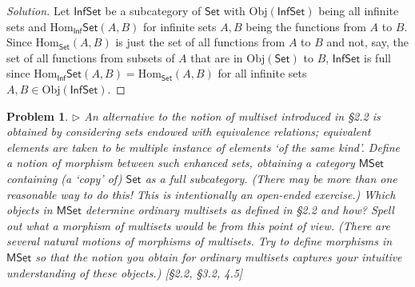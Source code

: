 \documentclass[fontsize=14pt]{scrartcl}
\newtheorem{problem-internal}{Problem}[subsection]
\newenvironment{problem}{
  \medskip
  \begin{problem-internal}
}{
  \end{problem-internal}
}
\newenvironment{solution}{
  \begin{proof}[Solution]
  \vspace{-8px}
  \setlength{\parskip}{4px}
  \setlength{\parindent}{0px}
}{
  \end{proof}
}
\newcommand{\Obj}{\mathrm{Obj}}
\newcommand{\Hom}{\mathrm{Hom}}
\begin{document}
\begin{solution}
\def \C {\mathsf{C}}
\def \Cp {\C'}
\def \Set {\mathsf{Set}}
\def \ISet {\mathsf{Inf}\mathsf{Set}}

Let $\ISet$ be a subcategory of $\Set$ with $\Obj(\ISet)$ being all infinite
sets and $\Hom_\ISet(A,B)$ for infinite sets $A,B$ being the functions from $A$
to $B$. Since $\Hom_\Set(A,B)$ is just the set of all functions from $A$ to $B$
and not, say, the set of all functions from subsets of $A$ that are in
$\Obj(\Set)$ to $B$, $\ISet$ is full since $\Hom_\ISet(A,B)=\Hom_\Set(A,B)$ for
all infinite sets $A,B\in\Obj(\ISet)$.
\end{solution}


\begin{problem}
\def \Set {\mathsf{Set}}
\def \MSet {\mathsf{MSet}}

$\rhd$ An alternative to the notion of \textit{multiset} introduced in
\S2.2 is obtained by considering sets endowed with equivalence relations;
equivalent elements are taken to be multiple instance of elements `of the same
kind'. Define a notion of morphism between such enhanced sets, obtaining a
category $\MSet$ containing (a `copy' of) $\Set$ as a full subcategory. (There
may be more than one reasonable way to do this! This is intentionally an
open-ended exercise.) Which objects in $\MSet$ determine ordinary multisets as
defined in \S2.2 and how? Spell out what a morphism of multisets would be from
this point of view. (There are several natural motions of morphisms of
multisets. Try to define morphisms in $\MSet$ so that the notion you obtain for
ordinary multisets captures your intuitive understanding of these objects.)
[\S2.2, \S3.2, 4.5]
\end{problem}
\end{document}
